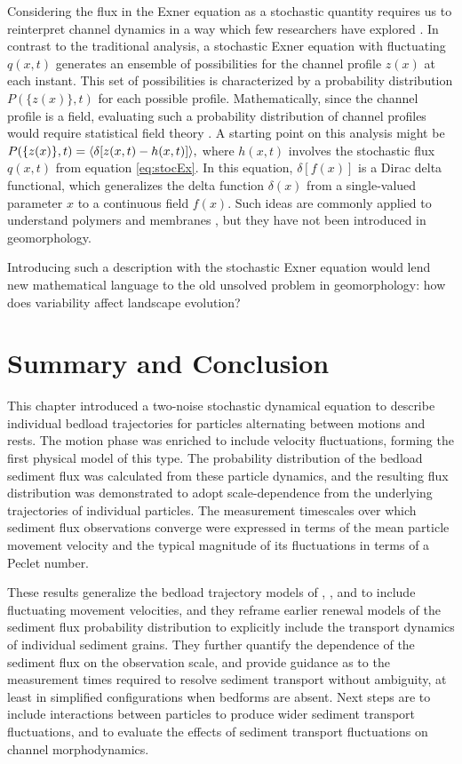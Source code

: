 Considering the flux in the Exner equation as a stochastic quantity requires us to reinterpret channel dynamics in a way which few researchers have explored \citep{Jerolmack2005,Bohorquez2016}.
In contrast to the traditional analysis, a stochastic Exner equation with fluctuating $q(x,t)$ generates an ensemble of possibilities for the channel profile $z(x)$ at each instant. This set of possibilities is characterized by a probability distribution $P(\{z(x)\},t)$ for each possible profile.
Mathematically, since the channel profile is a field, evaluating such a probability distribution of channel profiles would require statistical field theory \citep{Kardar2007}.
A starting point on this analysis might be $P(\{z(x)\},t) = \langle \delta[z(x,t)-h(x,t)]\rangle,$ where $h(x,t)$ involves the stochastic flux $q(x,t)$ from equation \ref{eq:stocEx}.
In this equation, $\delta[f(x)]$ is a Dirac delta functional, which generalizes the delta function $\delta(x)$ from a single-valued parameter $x$ to a continuous field $f(x)$.
Such ideas are commonly applied to understand polymers and membranes \citep{Kawakatsu2001,Nelson2004}, but they have not been introduced in geomorphology.

Introducing such a description with the stochastic Exner equation would lend new mathematical language to the old unsolved problem in geomorphology: how does variability affect landscape evolution?

\section{Summary and Conclusion \label{sec:conc}} 
 
This chapter introduced a two-noise stochastic dynamical equation to describe individual bedload trajectories for particles alternating between motions and rests. The motion phase was enriched to include velocity fluctuations, forming the first physical model of this type.
The probability distribution of the bedload sediment flux was calculated from these particle dynamics, and the resulting flux distribution was demonstrated to adopt scale-dependence from the underlying trajectories of individual particles. The measurement timescales over which sediment flux observations converge were expressed in terms of the mean particle movement velocity and the typical magnitude of its fluctuations in terms of a Peclet number.
 
These results generalize the bedload trajectory models of \citet{Einstein1937}, \citet{Lisle1998}, and \citet{Lajeunesse2017} to include fluctuating movement velocities, and they reframe earlier renewal models of the sediment flux probability distribution \citep{Lajeunesse2010,Ancey2020} to explicitly include the transport dynamics of individual sediment grains. They further quantify the dependence of the sediment flux on the observation scale, and provide guidance as to the measurement times required to resolve sediment transport without ambiguity, at least in simplified configurations when bedforms are absent. 
Next steps are to include interactions between particles to produce wider sediment transport fluctuations, and to evaluate the effects of sediment transport fluctuations on channel morphodynamics.




